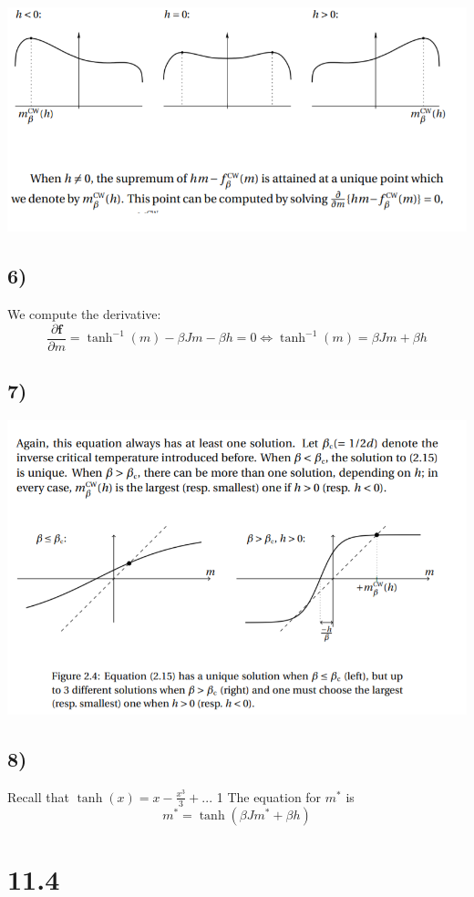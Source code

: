 \documentclass[10pt,a4paper]{book}
\newcommand{\p}{\partial}
\begin{document}
\includegraphics[scale=0.5]{TD4}

\subsection*{6)}
We compute the derivative:
$$\frac{\p\mathbf{f}}{\p m}=\tanh^{-1}(m)-\beta Jm-\beta h=0\Leftrightarrow \tanh^{-1}(m)=\beta Jm+\beta h$$

\subsection*{7)}
\includegraphics[scale=0.5]{TD2}

\subsection*{8)}
Recall that $\tanh(x)=x-\frac{x^3}{3}+..$. 1
The equation for $m^*$ is 
$$m^*=\tanh(\beta Jm^*+\beta h)$$





\section*{11.4}
\end{document}
